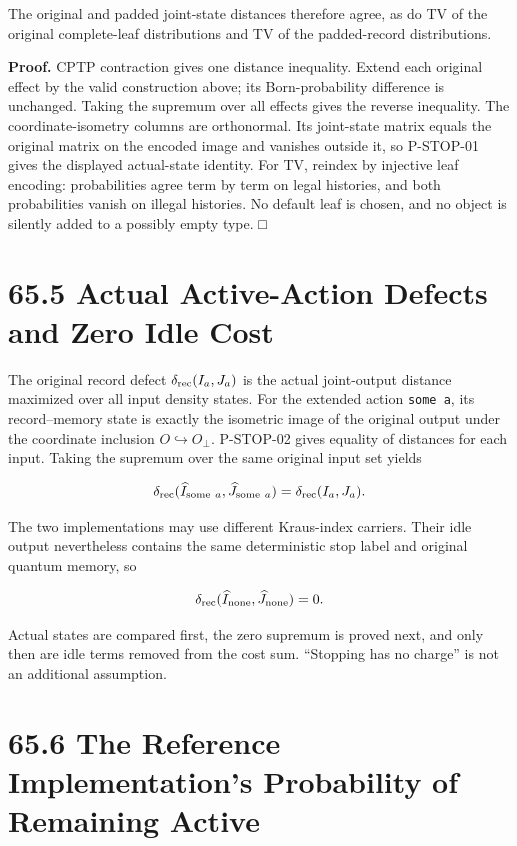 \documentclass[
  11pt,
  oneside]{book}
\begin{document}
The original and padded joint-state distances therefore agree, as do TV
of the original complete-leaf distributions and TV of the padded-record
distributions.

\textbf{Proof.} CPTP contraction gives one distance inequality. Extend
each original effect by the valid construction above; its
Born-probability difference is unchanged. Taking the supremum over all
effects gives the reverse inequality. The coordinate-isometry columns
are orthonormal. Its joint-state matrix equals the original matrix on
the encoded image and vanishes outside it, so P-STOP-01 gives the
displayed actual-state identity. For TV, reindex by injective leaf
encoding: probabilities agree term by term on legal histories, and both
probabilities vanish on illegal histories. No default leaf is chosen,
and no object is silently added to a possibly empty type. □

\section{65.5 Actual Active-Action Defects and Zero Idle Cost}

The original record defect \(\delta_{\rm rec}(I_a,J_a)\) is the actual
joint-output distance maximized over all input density states. For the
extended action \texttt{some\ a}, its record--memory state is exactly
the isometric image of the original output under the coordinate
inclusion \(O\hookrightarrow O_\bot\). P-STOP-02 gives equality of
distances for each input. Taking the supremum over the same original
input set yields

\[
\delta_{\rm rec}(\widehat I_{\mathrm{some}\ a},
\widehat J_{\mathrm{some}\ a})
=\delta_{\rm rec}(I_a,J_a).
\]

The two implementations may use different Kraus-index carriers. Their
idle output nevertheless contains the same deterministic stop label and
original quantum memory, so

\[
\delta_{\rm rec}(\widehat I_{\mathrm{none}},
\widehat J_{\mathrm{none}})=0.
\]

Actual states are compared first, the zero supremum is proved next, and
only then are idle terms removed from the cost sum. ``Stopping has no
charge'' is not an additional assumption.

\section{65.6 The Reference Implementation's Probability of Remaining
Active}
\end{document}
